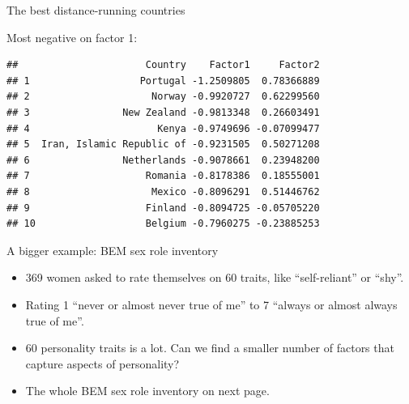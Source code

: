 \documentclass[ignorenonframetext,]{beamer}
\newenvironment{Shaded}{\begin{snugshade}}{\end{snugshade}}
\newcommand{\DataTypeTok}[1]{\textcolor[rgb]{0.13,0.29,0.53}{#1}}
\newcommand{\DecValTok}[1]{\textcolor[rgb]{0.00,0.00,0.81}{#1}}
\newcommand{\KeywordTok}[1]{\textcolor[rgb]{0.13,0.29,0.53}{\textbf{#1}}}
\newcommand{\NormalTok}[1]{#1}
\newcommand{\OperatorTok}[1]{\textcolor[rgb]{0.81,0.36,0.00}{\textbf{#1}}}
\newcommand{\StringTok}[1]{\textcolor[rgb]{0.31,0.60,0.02}{#1}}
\begin{document}
\begin{frame}[fragile]{The best distance-running countries}
\protect\hypertarget{the-best-distance-running-countries}{}

Most negative on factor 1:

\footnotesize

\begin{Shaded}
\end{Shaded}

\begin{verbatim}
##                      Country    Factor1     Factor2
## 1                   Portugal -1.2509805  0.78366889
## 2                     Norway -0.9920727  0.62299560
## 3                New Zealand -0.9813348  0.26603491
## 4                      Kenya -0.9749696 -0.07099477
## 5  Iran, Islamic Republic of -0.9231505  0.50271208
## 6                Netherlands -0.9078661  0.23948200
## 7                    Romania -0.8178386  0.18555001
## 8                     Mexico -0.8096291  0.51446762
## 9                    Finland -0.8094725 -0.05705220
## 10                   Belgium -0.7960275 -0.23885253
\end{verbatim}

\normalsize

\end{frame}

\begin{frame}{A bigger example: BEM sex role inventory}
\protect\hypertarget{a-bigger-example-bem-sex-role-inventory}{}

\begin{itemize}
\item
  369 women asked to rate themselves on 60 traits, like ``self-reliant''
  or ``shy''.
\item
  Rating 1 ``never or almost never true of me'' to 7 ``always or almost
  always true of me''.
\item
  60 personality traits is a lot. Can we find a smaller number of
  factors that capture aspects of personality?
\item
  The whole BEM sex role inventory on next page.
\end{itemize}

\end{frame}
\end{document}

